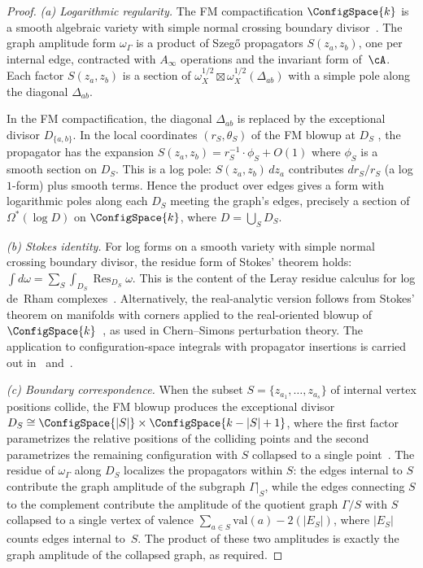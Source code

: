 \begin{proof}
\emph{(a) Logarithmic regularity.}
The FM compactification $\ConfigSpace{k}$ is a smooth algebraic
variety with simple normal crossing boundary
divisor~\cite{FM94}. The graph amplitude form $\omega_\Gamma$ is a
product of Szeg\H{o} propagators $S(z_a, z_b)$, one per internal
edge, contracted with $A_\infty$ operations and the invariant form
of~$\cA$. Each factor $S(z_a, z_b)$ is a section of
$\omega_X^{1/2} \boxtimes \omega_X^{1/2}(\Delta_{ab})$
with a simple pole along the diagonal $\Delta_{ab}$.

In the FM compactification, the diagonal $\Delta_{ab}$ is replaced
by the exceptional divisor $D_{\{a,b\}}$. In the local coordinates
$(r_S, \theta_S)$ of the FM blowup at $D_S$
\cite[§2]{FM94}, the propagator has the expansion
$S(z_a, z_b) = r_S^{-1} \cdot \phi_S + O(1)$ where $\phi_S$ is a
smooth section on $D_S$. This is a log pole:
$S(z_a,z_b) \, dz_a$ contributes $dr_S/r_S$ (a log
$1$-form) plus smooth terms. Hence the product over edges gives a
form with logarithmic poles along each $D_S$ meeting the graph's
edges, precisely a section of $\Omega^*(\log D)$ on
$\ConfigSpace{k}$, where $D = \bigcup_S D_S$.

\emph{(b) Stokes identity.}
For log forms on a smooth variety with simple normal crossing
boundary divisor, the residue form of Stokes' theorem holds:
$\int d\omega = \sum_S \int_{D_S} \operatorname{Res}_{D_S} \omega$.
This is the content of the Leray residue calculus for log de~Rham
complexes~\cite{Deligne70}. Alternatively, the real-analytic
version follows from Stokes' theorem on manifolds with corners
applied to the real-oriented blowup of
$\ConfigSpace{k}$~\cite{AS94}, as used in Chern--Simons
perturbation theory. The application to configuration-space
integrals with propagator insertions is carried out
in~\cite{Kon03} and~\cite{costello-renormalization}.

\emph{(c) Boundary correspondence.}
When the subset $S = \{z_{a_1}, \ldots, z_{a_s}\}$ of internal
vertex positions collide, the FM blowup produces the exceptional
divisor $D_S \cong \ConfigSpace{|S|} \times \ConfigSpace{k-|S|+1}$,
where the first factor parametrizes the relative positions of the
colliding points and the second parametrizes the remaining
configuration with $S$ collapsed to a single point~\cite[§3]{FM94}.
The residue of $\omega_\Gamma$ along $D_S$ localizes the
propagators within $S$: the edges internal to $S$ contribute the
graph amplitude of the subgraph $\Gamma|_S$, while the edges
connecting $S$ to the complement contribute the amplitude of the
quotient graph $\Gamma/S$ with $S$ collapsed to a single vertex
of valence $\sum_{a \in S} \mathrm{val}(a) - 2(|E_S|)$, where
$|E_S|$ counts edges internal to~$S$. The product of these two
amplitudes is exactly the graph amplitude of the collapsed graph,
as required.
\end{proof}

